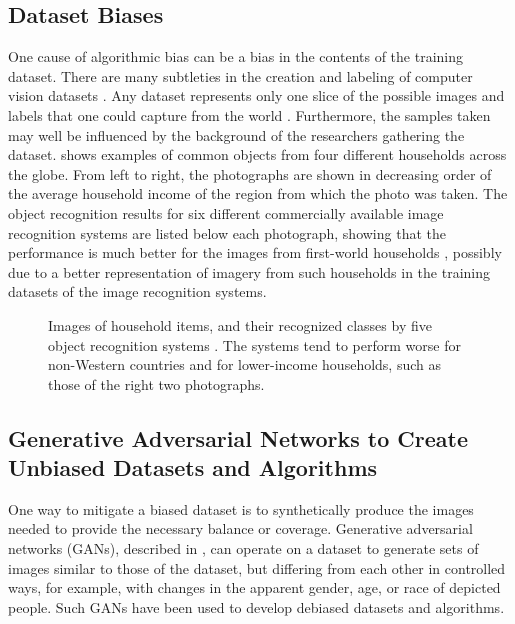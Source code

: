 

\subsection{Dataset Biases}

One cause of algorithmic bias can be a bias in the contents of the training dataset.
There are many subtleties in the creation and labeling of computer vision datasets \cite{Ramaswamy2021b}.
Any dataset represents only one slice of the possible images and labels that one could capture from the world \cite{Torralba2011}.
Furthermore, the samples taken may well be influenced by the background of the researchers gathering the dataset.
\Fig{\ref{fig:soap}} shows examples of common objects from four different households across the globe.  From left to right, the photographs are shown in decreasing order of the average household income of the region from which the photo was taken.  The object recognition results for six different commercially available image recognition systems are listed below each photograph, showing that the performance is much better for the images from first-world households \cite{DeVries2019},  possibly due to a better representation of imagery from such households in the training datasets of the image recognition systems.

\begin{figure}[t]
\centerline{
}
\caption{Images of household items, and their recognized classes by five object recognition systems \cite{DeVries2019}. The systems tend to perform worse for non-Western countries and for lower-income households, such as those of the right two photographs.}
\label{fig:soap}
\end{figure}



\subsection{Generative Adversarial Networks to Create Unbiased Datasets and Algorithms}

One way to mitigate a biased dataset is to synthetically produce the images needed to provide the necessary balance or coverage.
Generative adversarial networks (GANs), described in \chap{\ref{chapter:generative_models}}, can operate on a dataset  to generate sets of images similar to those of the dataset, but differing from each other in controlled ways, for example, with changes in the apparent gender, age, or race of depicted people.  Such GANs  have been used to develop debiased datasets and algorithms.

